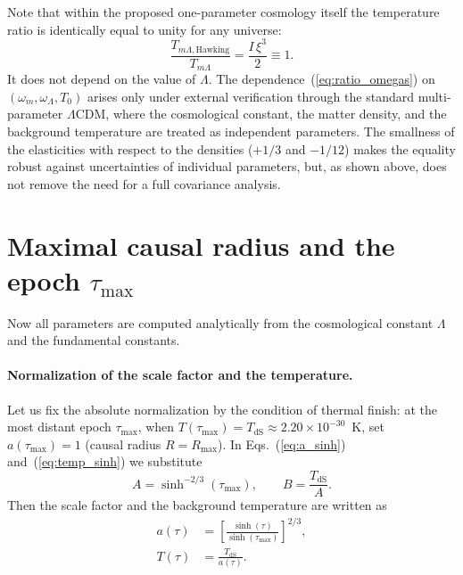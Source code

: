 \documentclass[10pt,a4paper]{article}
\begin{document}
Note that within the proposed one-parameter cosmology itself the temperature ratio is identically equal to unity for any universe:
\begin{equation}
\frac{T_{m\Lambda\mathrm{, Hawking}}}{T_{m\Lambda}} = \frac{I\,\xi^3}{2} \equiv 1.
\end{equation}
It does not depend on the value of $\Lambda$. The dependence~(\ref{eq:ratio_omegas}) on $(\omega_m, \omega_\Lambda, T_0)$ arises only under external verification through the standard multi-parameter $\Lambda$CDM, where the cosmological constant, the matter density, and the background temperature are treated as independent parameters. The smallness of the elasticities with respect to the densities ($+1/3$ and $-1/12$) makes the equality robust against uncertainties of individual parameters, but, as shown above, does not remove the need for a full covariance analysis.

\section{Maximal causal radius and the epoch \texorpdfstring{$\tau_{\max}$}{τ\_max}}
\label{sec:taumax}

Now all parameters are computed analytically from the cosmological constant $\Lambda$ and the fundamental constants.

\paragraph{Normalization of the scale factor and the temperature.}
Let us fix the absolute normalization by the condition of thermal finish: at the most distant epoch $\tau_{\max}$, when $T(\tau_{\max}) = T_{\mathrm{dS}} \approx 2.20 \times 10^{-30}$~K, set $a(\tau_{\max}) = 1$ (causal radius $R = R_{\max}$). In Eqs.~(\ref{eq:a_sinh}) and~(\ref{eq:temp_sinh}) we substitute
\begin{equation}
A = \sinh^{-2/3}(\tau_{\max}), \qquad B = \frac{T_{\mathrm{dS}}}{A}.
\end{equation}
Then the scale factor and the background temperature are written as
\begin{align}
a(\tau) &= \left[\frac{\sinh(\tau)}{\sinh(\tau_{\max})}\right]^{2/3}, \label{eq:scale} \\[6pt]
T(\tau) &= \frac{T_{\mathrm{dS}}}{a(\tau)}. \label{eq:temp}
\end{align}
\end{document}
